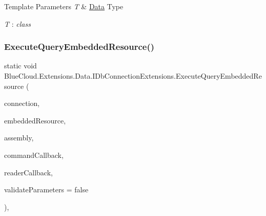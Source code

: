 \begin{DoxyTemplParams}{Template Parameters}
{\em T} & \mbox{\hyperlink{namespace_blue_cloud_1_1_extensions_1_1_data}{Data}} Type\\
\hline
\end{DoxyTemplParams}
\begin{Desc}
\item[Type Constraints]\begin{description}
\item[{\em T} : {\em class}]\end{description}
\end{Desc}
\mbox{\label{class_blue_cloud_1_1_extensions_1_1_data_1_1_i_db_connection_extensions_a430c474cab2d89d20604579a66052020}} 
\subsubsection{\texorpdfstring{Execute\+Query\+Embedded\+Resource()}{ExecuteQueryEmbeddedResource()}\hspace{0.1cm}{\footnotesize\ttfamily [1/4]}}
{\footnotesize\ttfamily static void Blue\+Cloud.\+Extensions.\+Data.\+I\+Db\+Connection\+Extensions.\+Execute\+Query\+Embedded\+Resource (\begin{DoxyParamCaption}\item[{this I\+Db\+Connection}]{connection,  }\item[{string}]{embedded\+Resource,  }\item[{System.\+Reflection.\+Assembly}]{assembly,  }\item[{Action$<$ I\+Db\+Command $>$}]{command\+Callback,  }\item[{Action$<$ I\+Data\+Reader $>$}]{reader\+Callback,  }\item[{bool}]{validate\+Parameters = {\ttfamily false} }\end{DoxyParamCaption})\hspace{0.3cm}{\ttfamily [inline]}, {\ttfamily [static]}}



